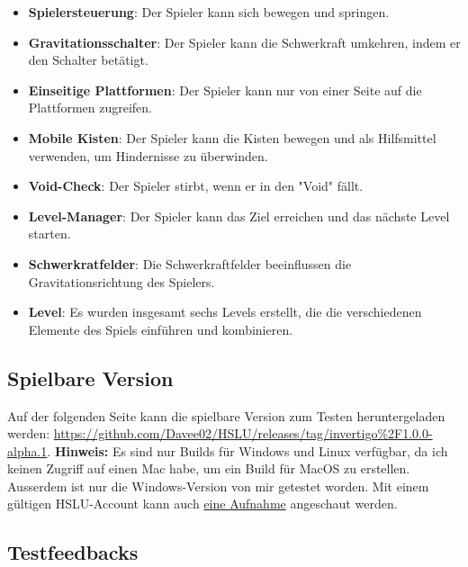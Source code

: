 \documentclass{article}
\begin{document}
\begin{itemize}
    \item \textbf{Spielersteuerung}: Der Spieler kann sich bewegen und springen.
    \item \textbf{Gravitationsschalter}: Der Spieler kann die Schwerkraft umkehren, indem er den Schalter betätigt.
    \item \textbf{Einseitige Plattformen}: Der Spieler kann nur von einer Seite auf die Plattformen zugreifen.
    \item \textbf{Mobile Kisten}: Der Spieler kann die Kisten bewegen und als Hilfsmittel verwenden, um Hindernisse zu überwinden.
    \item \textbf{Void-Check}: Der Spieler stirbt, wenn er in den "Void" fällt.
    \item \textbf{Level-Manager}: Der Spieler kann das Ziel erreichen und das nächste Level starten.
    \item \textbf{Schwerkratfelder}: Die Schwerkraftfelder beeinflussen die Gravitationsrichtung des Spielers.
    \item \textbf{Level}: Es wurden insgesamt sechs Levels erstellt, die die verschiedenen Elemente des Spiels einführen und kombinieren.
\end{itemize}

\subsection{Spielbare Version}

Auf der folgenden Seite kann die spielbare Version zum Testen heruntergeladen werden: \url{https://github.com/Davee02/HSLU/releases/tag/invertigo%2F1.0.0-alpha.1}.
\textbf{Hinweis:} Es sind nur Builds für Windows und Linux verfügbar, da ich keinen Zugriff auf einen Mac habe, um ein Build für MacOS zu erstellen. Ausserdem ist nur die Windows-Version
von mir getestet worden. Mit einem gültigen HSLU-Account kann auch \href{https://hsluzern-my.sharepoint.com/:v:/g/personal/david_hodel_stud_hslu_ch/ERNPkmf1C21Gv_LZLtlVvyMBVqpiyUY922O5hHg5LMQeQw?e=HGsUoI&nav=eyJyZWZlcnJhbEluZm8iOnsicmVmZXJyYWxBcHAiOiJTdHJlYW1XZWJBcHAiLCJyZWZlcnJhbFZpZXciOiJTaGFyZURpYWxvZy1MaW5rIiwicmVmZXJyYWxBcHBQbGF0Zm9ybSI6IldlYiIsInJlZmVycmFsTW9kZSI6InZpZXcifX0%3D}{eine Aufnahme}
angeschaut werden. 

\subsection{Testfeedbacks}
\end{document}
